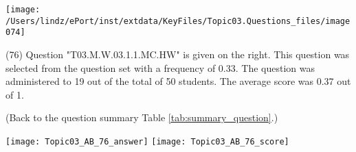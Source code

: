 \documentclass[12pt,english,nohyper]{tufte-handout}\usepackage[]{graphicx}\usepackage[]{color}
\begin{document}
\vspace{5cm}\begin{marginfigure}\texttt{[image: /Users/lindz/ePort/inst/extdata/KeyFiles/Topic03.Questions\_files/image074]}\end{marginfigure}\vspace{-5cm} (76) Question "T03.M.W.03.1.1.MC.HW" is given on the right. This question was selected from the question set with a frequency of 0.33. The question was administered to 19 out of the total of 50 students. The average score was 0.37 out of 1.

 (Back to the question summary Table \ref{tab:summary_question}.)

\begin{center} \texttt{[image: Topic03\_AB\_76\_answer]} \texttt{[image: Topic03\_AB\_76\_score]} \end{center} 
\end{document}
